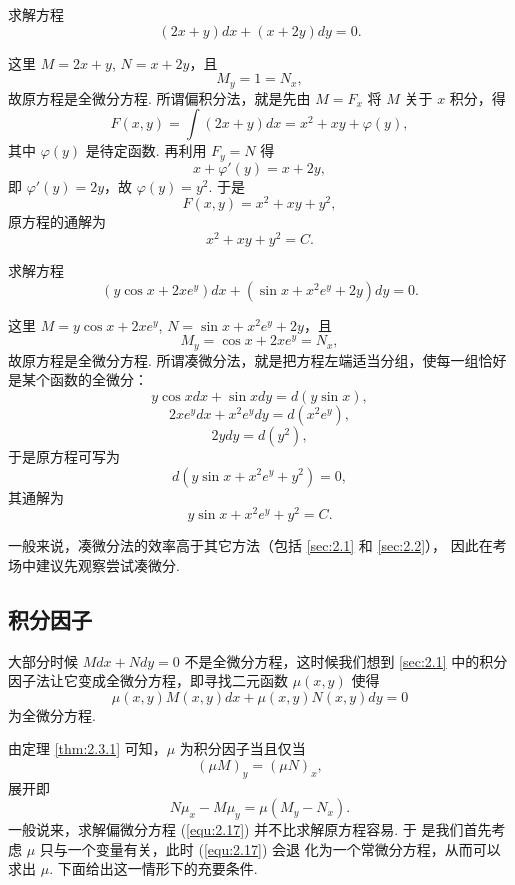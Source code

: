 \begin{eg}
求解方程
\[
(2x+y)dx+(x+2y)dy=0.
\]
\begin{pf2}
这里 $M=2x+y$, $N=x+2y$，且
\[
M_y=1=N_x,
\]
故原方程是全微分方程. 所谓偏积分法，就是先由 $M=F_x$ 将 $M$ 关于 $x$ 积分，得
\[
F(x,y)=\int(2x+y)dx=x^2+xy+\varphi(y),
\]
其中 $\varphi(y)$ 是待定函数. 再利用 $F_y=N$ 得
\[
x+\varphi'(y)=x+2y,
\]
即 $\varphi'(y)=2y$，故 $\varphi(y)=y^2$. 于是
\[
F(x,y)=x^2+xy+y^2,
\]
原方程的通解为
\[
x^2+xy+y^2=C.
\]
\end{pf2}
\end{eg}

\begin{eg}
求解方程
\[
(y\cos x+2xe^y)dx+(\sin x+x^2e^y+2y)dy=0.
\]
\begin{pf2}
这里 $M=y\cos x+2xe^y$, $N=\sin x+x^2e^y+2y$，且
\[
M_y=\cos x+2xe^y=N_x,
\]
故原方程是全微分方程. 所谓凑微分法，就是把方程左端适当分组，使每一组恰好是某个函数的全微分：
\[
y\cos x dx+\sin x dy=d(y\sin x),
\]
\[
2xe^y dx+x^2e^y dy=d(x^2e^y),
\]
\[
2y dy=d(y^2),
\]
于是原方程可写为
\[
d(y\sin x+x^2e^y+y^2)=0,
\]
其通解为
\[
y\sin x+x^2e^y+y^2=C.
\]
\end{pf2}
\end{eg}
\begin{rmk}
一般来说，凑微分法的效率高于其它方法（包括 \ref{sec:2.1} 和 \ref{sec:2.2}），
因此在考场中建议先观察尝试凑微分.
\end{rmk}

\subsection{积分因子}
大部分时候 $Mdx+Ndy=0$ 不是全微分方程，这时候我们想到 \ref{sec:2.1}
中的积分因子法让它变成全微分方程，即寻找二元函数 $\mu(x,y)$ 使得
\[
\mu(x,y)M(x,y)dx+\mu(x,y)N(x,y)dy=0
\]
为全微分方程.

由定理 \ref{thm:2.3.1} 可知，$\mu$ 为积分因子当且仅当
\begin{equation}\label{equ:2.16}
(\mu M)_y=(\mu N)_x,
\end{equation}
展开即
\begin{equation}\label{equ:2.17}
N\mu_x-M\mu_y=\mu(M_y-N_x).
\end{equation}
一般说来，求解偏微分方程 (\ref{equ:2.17}) 并不比求解原方程容易. 于
是我们首先考虑 $\mu$ 只与一个变量有关，此时 (\ref{equ:2.17}) 会退
化为一个常微分方程，从而可以求出 $\mu$. 下面给出这一情形下的充要条件.

